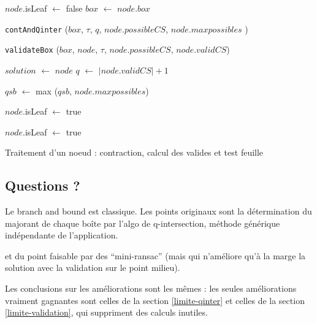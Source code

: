 \documentclass{article}
\begin{document}
\begin{algorithm}[htb]
\SetVline
{\small
{}
{
  $node$.isLeaf $\gets$ false\;
$box$ $\gets$ $node.box$ \;
   
   {\tt contAndQinter} ($box$, $\tau$, $q$, $node.possibleCS$, $node.maxpossibles$ ) \;
                                    
    {
       {\tt validateBox} ($box$, $node$, $\tau$, $node.possibleCS$, $node.validCS$) \;

            { $solution$ $\gets$  $node$ \;
              $q$ $\gets$ $|node.validCS| +1$\;
              }\;
                {
            {$qsb$  $\gets$ max ($qsb$, $node.maxpossibles$)}
                
               $node$.isLeaf $\gets$ true
                }         
    }
     {$node$.isLeaf $\gets$ true}

}
}


\caption{Traitement d'un noeud : contraction, calcul des valides et test feuille}
\label{algo:qinterestim}
\end{algorithm}



\subsection {Questions ?}


Le branch and bound est classique. 
Les points originaux sont la d\'etermination du majorant de chaque bo\^ite par l'algo de q-intersection, m\'ethode g\'en\'erique ind\'ependante
de l'application.

et du point faisable par des ``mini-ransac''   (mais qui n'am\'eliore qu'\`a la marge la solution avec la validation sur le point milieu).


Les conclusions sur les am\'eliorations sont les m\^emes : les seules am\'eliorations vraiment gagnantes sont celles de la section \ref{limite-qinter} et celles de la section \ref{limite-validation}, qui suppriment des calculs inutiles.
\end{document}
